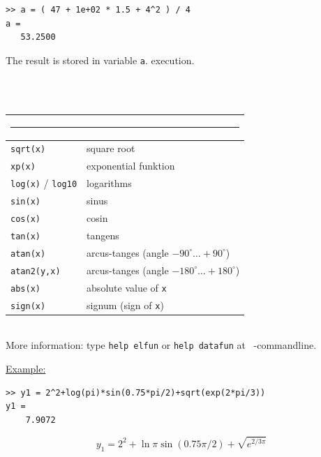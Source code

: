 \begin{minipage}[t]{0.5\textwidth}
{\small\begin{verbatim}
>> a = ( 47 + 1e+02 * 1.5 + 4^2 ) / 4
a =
   53.2500
\end{verbatim}}
\end{minipage}
\hfill
\begin{minipage}[t]{0.49\textwidth}
The result is stored in variable \verb(a(. execution.
\end{minipage}\\

\vspace*{-0.2cm}
$\phantom{x}$

\begin{tabular}{ll}
\multicolumn{2}{c}{\rule{0.97\textwidth}{0pt}}\\[-2ex]\hline
\verb/sqrt(x)/ & square root\\
\verb/xp(x)/ & exponential funktion\\
\verb/log(x)/ / \verb/log10/ & logarithms\\
\verb/sin(x)/ & sinus\\
\verb/cos(x)/ & cosin\\
\verb/tan(x)/ & tangens\\
\verb/atan(x)/ & arcus-tanges (angle $-90^{\circ}\ldots+90^{\circ}$)\\
\verb/atan2(y,x)/ & arcus-tanges (angle $-180^{\circ}\ldots+180^{\circ}$)\\
\verb/abs(x)/ & absolute value of \verb/x/\\
\verb/sign(x)/ & signum (sign of \verb/x/)\\
\hline
\end{tabular}\\
More information: type \verb/help elfun/ or
\verb/help datafun/ at \matl\ -commandline.


\underline{Example:}\\
\begin{minipage}[t]{0.5\textwidth}
\small\begin{verbatim}
>> y1 = 2^2+log(pi)*sin(0.75*pi/2)+sqrt(exp(2*pi/3))
y1 =
    7.9072
\end{verbatim}
\end{minipage}
\hfill
\begin{minipage}[t]{0.49\textwidth}
$$ y_1 = 2^2 + \ln \pi \sin(0.75\pi/2) + \sqrt{e^{2/3\pi}}$$
\end{minipage}

\vspace*{-0.2cm}
$\phantom{x}$

